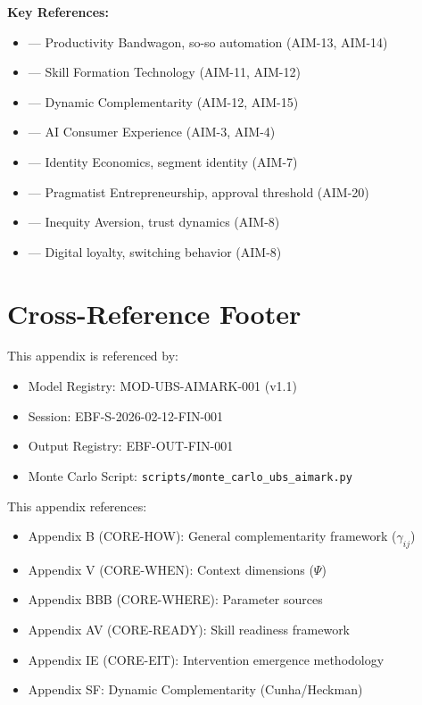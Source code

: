 \textbf{Key References:}
\begin{itemize}[nosep]
\item \citet{acemoglu2023power} --- Productivity Bandwagon, so-so automation (AIM-13, AIM-14)
\item \citet{cunha2007technology} --- Skill Formation Technology (AIM-11, AIM-12)
\item \citet{heckman2025dynamic} --- Dynamic Complementarity (AIM-12, AIM-15)
\item \citet{puntoni2021consumers} --- AI Consumer Experience (AIM-3, AIM-4)
\item \citet{akerlof2000economics} --- Identity Economics, segment identity (AIM-7)
\item \citet{zellweger2023pragmatist} --- Pragmatist Entrepreneurship, approval threshold (AIM-20)
\item \citet{fehr1999theory} --- Inequity Aversion, trust dynamics (AIM-8)
\item \citet{herhausen2019loyalty} --- Digital loyalty, switching behavior (AIM-8)
\end{itemize}


\section{Cross-Reference Footer}
\label{sec:aim-xref}

This appendix is referenced by:
\begin{itemize}
\item Model Registry: MOD-UBS-AIMARK-001 (v1.1)
\item Session: EBF-S-2026-02-12-FIN-001
\item Output Registry: EBF-OUT-FIN-001
\item Monte Carlo Script: \texttt{scripts/monte\_carlo\_ubs\_aimark.py}
\end{itemize}

This appendix references:
\begin{itemize}
\item Appendix B (CORE-HOW): General complementarity framework ($\gamma_{ij}$)
\item Appendix V (CORE-WHEN): Context dimensions ($\Psi$)
\item Appendix BBB (CORE-WHERE): Parameter sources
\item Appendix AV (CORE-READY): Skill readiness framework
\item Appendix IE (CORE-EIT): Intervention emergence methodology
\item Appendix SF: Dynamic Complementarity (Cunha/Heckman)
\end{itemize}
